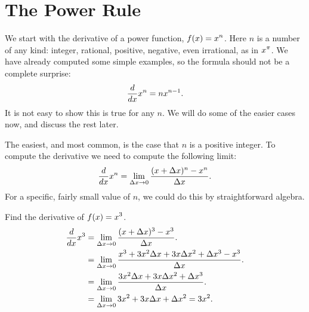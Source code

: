 \section{The Power Rule}{}{}

We start with the derivative of a power function, $\displaystyle f(x)=x^n$. Here $n$ is a number of any kind: integer,
rational, positive, negative, even irrational, as in $\displaystyle x^\pi$. We have
already computed some simple examples, so the formula should not be a
complete surprise:
$${d\over dx}x^n = nx^{n-1}.$$
It is not easy to show this is true for any $n$. We will do some of
the easier cases now, and discuss the rest later.

The easiest, and most common, is the case that $n$ is a positive
integer. To compute the derivative we need to compute the following
limit:
$${d\over dx}x^n = \lim_{\Delta x\to0} {(x+\Delta x)^n-x^n\over \Delta
  x}.
$$
For a specific, fairly small value of $n$, we could do this by
straightforward algebra.

\begin{example}
Find the derivative of $\displaystyle f(x)=x^3$.
\begin{align*}
{d\over dx}x^3 &= \lim_{\Delta x\to0} {(x+\Delta x)^3-x^3\over \Delta
  x}. \\
&=\lim_{\Delta x\to0} {x^3+3x^2\Delta x+3x\Delta x^2 + \Delta x^3
-x^3\over \Delta x}. \\
&=\lim_{\Delta x\to0}{3x^2\Delta x+3x\Delta x^2 + \Delta x^3\over \Delta x}. \\
&=\lim_{\Delta x\to0}3x^2+3x\Delta x + \Delta x^2 = 3x^2. \\
\end{align*}
\vskip-10pt
\end{example}

